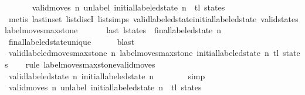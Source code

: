 \begin{isabellebody}
\ \ \ \ \isamarkupfalse%
\ {\isacharasterisk}\ {\isacartoucheopen}valid{\isacharunderscore}moves\ n\ {\isacharparenleft}unlabel\ {\isacharparenleft}initial{\isacharunderscore}labeled{\isacharunderscore}state\ n{\isacharparenright}\ {\isacharhash}\ tl\ states{\isacharparenright}{\isacartoucheclose}\isanewline
\ \ \ \ \isamarkupfalse%
\ {\isacharparenleft}metis\ last{\isacharunderscore}in{\isacharunderscore}set\ list{\isachardot}discI\ list{\isachardot}simps{\isacharparenleft}{}{\isacharparenright}\ valid{\isacharunderscore}labeled{\isacharunderscore}state{\isacharunderscore}initial{\isacharunderscore}labeled{\isacharunderscore}state\ valid{\isacharunderscore}states{\isacharunderscore}label{\isacharunderscore}moves{\isacharunderscore}max{\isacharunderscore}stone{\isacharparenright}\isanewline
\ \ \isamarkupfalse%
\isanewline
\ \ \isamarkupfalse%
\ {\isachardoublequoteopen}last\ {\isacharquery}l{\isacharunderscore}states\ {\isacharequal}\ final{\isacharunderscore}labeled{\isacharunderscore}state\ n{\isachardoublequoteclose}\isanewline
\ \ \ \ \isamarkupfalse%
\ final{\isacharunderscore}labeled{\isacharunderscore}state{\isacharunderscore}unique\isanewline
\ \ \ \ \isamarkupfalse%
\ blast\isanewline
\isanewline
\ \ \isamarkupfalse%
\ {\isachardoublequoteopen}valid{\isacharunderscore}labeled{\isacharunderscore}moves{\isacharunderscore}max{\isacharunderscore}stone\ n\ {\isacharparenleft}label{\isacharunderscore}moves{\isacharunderscore}max{\isacharunderscore}stone\ {\isacharparenleft}initial{\isacharunderscore}labeled{\isacharunderscore}state\ n{\isacharparenright}\ {\isacharparenleft}tl\ states{\isacharparenright}{\isacharparenright}{\isachardoublequoteclose}\isanewline
\ \ \isamarkupfalse%
\ {\isacharparenleft}rule\ label{\isacharunderscore}moves{\isacharunderscore}max{\isacharunderscore}stone{\isacharunderscore}valid{\isacharunderscore}moves{\isacharparenright}\isanewline
\ \ \ \ \isamarkupfalse%
\ {\isachardoublequoteopen}valid{\isacharunderscore}labeled{\isacharunderscore}state\ n\ {\isacharparenleft}initial{\isacharunderscore}labeled{\isacharunderscore}state\ n{\isacharparenright}{\isachardoublequoteclose}\isanewline
\ \ \ \ \ \ \isamarkupfalse%
\ simp\isanewline
\ \ \isamarkupfalse%
\isanewline
\ \ \ \ \isamarkupfalse%
\ {\isachardoublequoteopen}valid{\isacharunderscore}moves\ n\ {\isacharparenleft}unlabel\ {\isacharparenleft}initial{\isacharunderscore}labeled{\isacharunderscore}state\ n{\isacharparenright}\ {\isacharhash}\ tl\ states{\isacharparenright}{\isachardoublequoteclose}\isanewline

\end{isabellebody}

